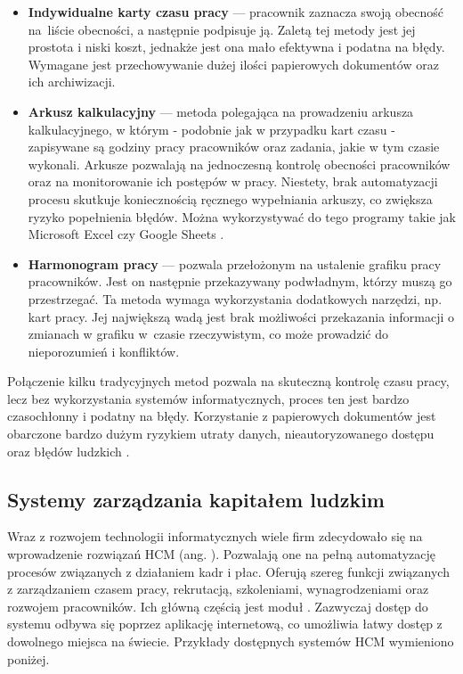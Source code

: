 \begin{itemize}
    \item \textbf{Indywidualne karty czasu pracy} \cite{bib:PotwierdzenieObecnosci} --- pracownik zaznacza swoją obecność na~liście obecności, a następnie podpisuje ją. Zaletą tej metody jest jej prostota i niski koszt, jednakże jest ona mało efektywna i podatna na błędy. Wymagane jest przechowywanie dużej ilości papierowych dokumentów oraz ich archiwizacji.
    \item \textbf{Arkusz kalkulacyjny} --- metoda polegająca na prowadzeniu arkusza kalkulacyjnego, w którym - podobnie jak w przypadku kart czasu - zapisywane są godziny pracy pracowników oraz zadania, jakie w tym czasie wykonali. Arkusze pozwalają na jednoczesną kontrolę obecności pracowników oraz na monitorowanie ich postępów w pracy. Niestety, brak automatyzacji procesu skutkuje koniecznością ręcznego wypełniania arkuszy, co zwiększa ryzyko popełnienia błędów. Można wykorzystywać do tego programy takie jak Microsoft Excel czy Google Sheets \cite{bib:ExcelTimeTracking}.
    \item \textbf{Harmonogram pracy} --- pozwala przełożonym na ustalenie grafiku pracy pracowników. Jest on następnie przekazywany podwładnym, którzy muszą go przestrzegać. Ta metoda wymaga wykorzystania dodatkowych narzędzi, np. kart pracy. Jej największą wadą jest brak możliwości przekazania informacji o zmianach w grafiku w~czasie rzeczywistym, co może prowadzić do nieporozumień i konfliktów.
\end{itemize}

Połączenie kilku tradycyjnych metod pozwala na skuteczną kontrolę czasu pracy, lecz bez wykorzystania systemów informatycznych, proces ten jest bardzo czasochłonny i podatny na błędy. Korzystanie z papierowych dokumentów jest obarczone bardzo dużym ryzykiem utraty danych, nieautoryzowanego dostępu oraz błędów ludzkich \cite{bib:LuceosSmart}.

\subsection{Systemy zarządzania kapitałem ludzkim}

Wraz z rozwojem technologii informatycznych wiele firm zdecydowało się na wprowadzenie rozwiązań HCM (ang. ). Pozwalają one na pełną automatyzację procesów związanych z działaniem kadr i płac. Oferują szereg funkcji związanych z zarządzaniem czasem pracy, rekrutacją, szkoleniami, wynagrodzeniami oraz rozwojem pracowników. Ich główną częścią jest moduł  \cite{bib:OracleHCMWhatIs}. Zazwyczaj dostęp do systemu odbywa się poprzez aplikację internetową, co umożliwia łatwy dostęp z dowolnego miejsca na świecie. Przykłady dostępnych systemów HCM wymieniono poniżej.

